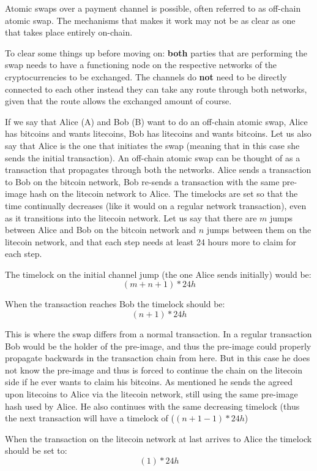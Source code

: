 Atomic swaps over a payment channel is possible, often referred to as off-chain atomic swap. The mechanisms that makes it work may not be as clear as one that takes place entirely on-chain. 

To clear some things up before moving on: \textbf{both} parties that are performing the swap needs to have a functioning node on the respective networks of the cryptocurrencies to be exchanged. The channels do \textbf{not} need to be directly connected to each other instead they can take any route through both networks, given that the route allows the exchanged amount of course.

If we say that Alice (A) and Bob (B) want to do an off-chain atomic swap, Alice has bitcoins and wants litecoins, Bob has litecoins and wants bitcoins. Let us also say that Alice is the one that initiates the swap (meaning that in this case she sends the initial transaction). An off-chain atomic swap can be thought of as a transaction that propagates through both the networks. Alice sends a transaction to Bob on the bitcoin network, Bob re-sends a transaction with the same pre-image hash on the litecoin network to Alice. The timelocks are set so that the time continually decreases (like it would on a regular network transaction), even as it transitions into the litecoin network. Let us say that there are $m$ jumps between Alice and Bob on the bitcoin network and $n$ jumps between them on the litecoin network, and that each step needs at least 24 hours more to claim for each step. 

The timelock on the initial channel jump (the one Alice sends initially) would be:
$$(m+n+1) * 24h$$

When the transaction reaches Bob the timelock should be: 
$$(n+1) * 24h$$

This is where the swap differs from a normal transaction. In a regular transaction Bob would be the holder of the pre-image, and thus the pre-image could properly propagate backwards in the transaction chain from here. But in this case he does not know the pre-image and thus is forced to continue the chain on the litecoin side if he ever wants to claim his bitcoins. As mentioned he sends the agreed upon litecoins to Alice via the litecoin network, still using the same pre-image hash used by Alice. He also continues with the same decreasing timelock (thus the next transaction will have a timelock of ($(n+1 - 1) * 24h$)

When the transaction on the litecoin network at last arrives to Alice the timelock should be set to:
$$(1) * 24h$$

